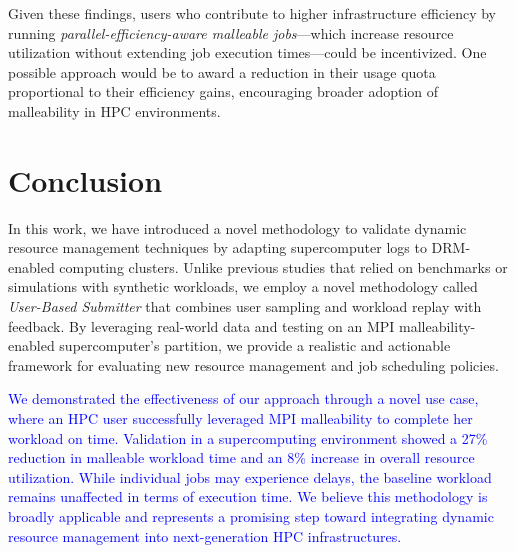 \documentclass[a4paper,fleqn]{cas-dc}
\newcommand{\review}[1]{\textcolor{blue}{#1}}
\begin{document}
Given these findings, users who contribute to higher infrastructure efficiency by running \textit{parallel-efficiency-aware malleable jobs}—which increase resource utilization without extending job execution times—could be incentivized. One possible approach would be to award a reduction in their usage quota proportional to their efficiency gains, encouraging broader adoption of malleability in HPC environments.  

\section{Conclusion}\label{sec:conclusion}
In this work, we have introduced a novel methodology to validate dynamic resource management techniques by adapting supercomputer logs to DRM-enabled computing clusters.
Unlike previous studies that relied on benchmarks or simulations with synthetic workloads, we employ a novel methodology called \textit{User-Based Submitter} that combines user sampling and workload replay with feedback.
By leveraging real-world data and testing on an MPI malleability-enabled supercomputer's partition, we provide a realistic and actionable framework for evaluating new resource management and job scheduling policies.

\review{
We demonstrated the effectiveness of our approach through a novel use case, where an HPC user successfully leveraged MPI malleability to complete her workload on time. Validation in a supercomputing environment showed a 27\% reduction in malleable workload time and an 8\% increase in overall resource utilization. While individual jobs may experience delays, the baseline workload remains unaffected in terms of execution time. We believe this methodology is broadly applicable and represents a promising step toward integrating dynamic resource management into next-generation HPC infrastructures.
}

\end{document}
